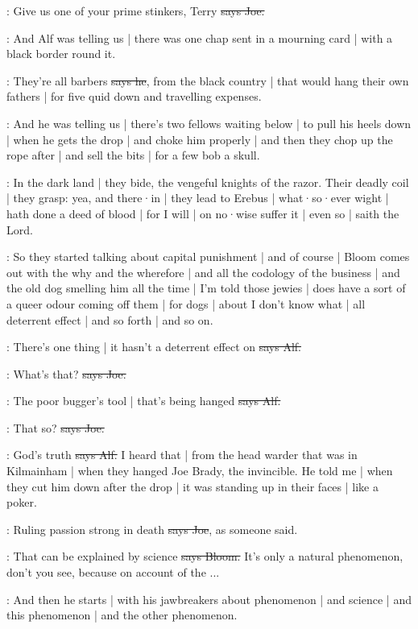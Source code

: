 \joe:
Give us one of your prime stinkers,
Terry
\sout{says Joe.}

\Nq:
And Alf was telling us |
there was one chap sent in a mourning card |
with a black border
round it.

\bergan:
They're all barbers
\sout{says he},
from the black country |
that would hang their own fathers |
for five quid down and travelling expenses.

\Nq:
And he was telling us |
there's two fellows waiting below |
to pull his heels down |
when he gets the drop |
and choke him properly |
and then they chop up the rope after |
and sell the bits |
for a few bob a skull.

:
In the dark land |
they bide,
the vengeful knights of the razor.
Their deadly coil |
they grasp:
yea,
and there·in |
they lead to Erebus |
what·so·ever wight |
hath done a deed of blood |
for I will |
on no·wise suffer it |
even so |
saith the Lord.

\Nq:
So they started talking about capital punishment
 |
and of course |
Bloom comes out with the why and the wherefore |
and all the codology of the business |
and the old dog smelling him all the time |
I'm told those jewies |
does have a sort of a queer odour coming off them |
for dogs |
about I don't know what |
all deterrent effect |
and so forth |
and so on.

\bergan:
There's one thing |
it hasn't a deterrent effect on
\sout{says Alf.}

\joe:
What's that?
\sout{says Joe.}

\bergan:
The poor bugger's tool |
that's being hanged
\sout{says Alf.}

\joe:
That so?
\sout{says Joe.}

\bergan:
God's truth
\sout{says Alf.}
I heard that |
from the head warder that was in Kilmainham |
when they hanged Joe Brady,
the invincible.
He told me |
when they cut him down after the drop |
it was standing up in their faces |
like a poker.

\joe:
Ruling passion strong in death
\sout{says Joe},
as someone said.

\Bloom:
That can be explained by science
\sout{says Bloom.}
It's only a natural phenomenon,
don't you see,
because on account of the ...

\Nq:
And then he starts |
with his jawbreakers about phenomenon |
and science |
and this phenomenon |
and the other phenomenon.

